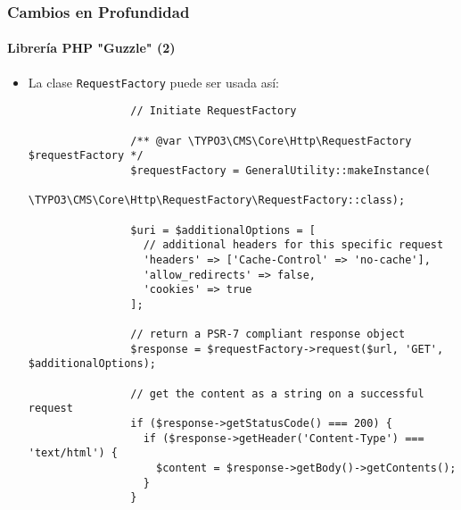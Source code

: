 \begin{frame}[fragile]
	\frametitle{Cambios en Profundidad}
	\framesubtitle{Librería PHP "Guzzle" (2)}

	\lstset{basicstyle=\tiny\ttfamily}

	\begin{itemize}

		\item La clase \texttt{RequestFactory} puede ser usada así:

			\begin{lstlisting}
				// Initiate RequestFactory

				/** @var \TYPO3\CMS\Core\Http\RequestFactory $requestFactory */
				$requestFactory = GeneralUtility::makeInstance(
				  \TYPO3\CMS\Core\Http\RequestFactory\RequestFactory::class);

				$uri = $additionalOptions = [
				  // additional headers for this specific request
				  'headers' => ['Cache-Control' => 'no-cache'],
				  'allow_redirects' => false,
				  'cookies' => true
				];

				// return a PSR-7 compliant response object
				$response = $requestFactory->request($url, 'GET', $additionalOptions);

				// get the content as a string on a successful request
				if ($response->getStatusCode() === 200) {
				  if ($response->getHeader('Content-Type') === 'text/html') {
				    $content = $response->getBody()->getContents();
				  }
				}
			\end{lstlisting}

	\end{itemize}

\end{frame}

